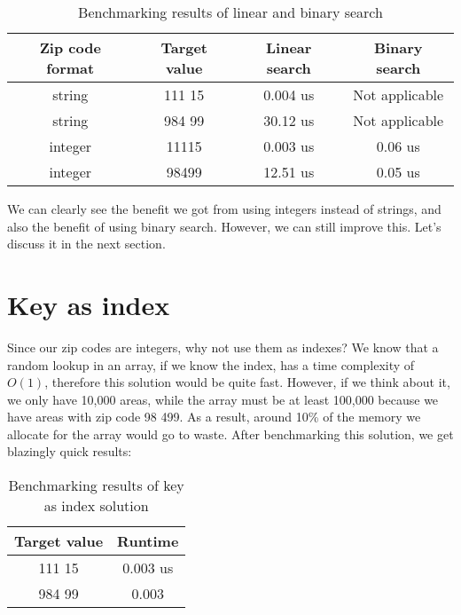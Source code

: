 \documentclass[a4paper,11pt]{article}
\begin{document}
    \begin{table}[H]
    \begin{center}
    \begin{tabular}{c|c|c|c}
    \textbf{Zip code format} & \textbf{Target value} & \textbf{Linear search} & \textbf{Binary search}\\
    \hline
        string  &   111 15     &  0.004 us &     Not applicable\\
        string &    984 99    &  30.12 us &     Not applicable\\
        integer &    11115    &  0.003 us &     0.06 us\\
        integer &    98499    &  12.51 us &     0.05 us\\
    \end{tabular}
    \caption{Benchmarking results of linear and binary search}
    \label{tab:table1}
    \end{center}
    \end{table}

    We can clearly see the benefit we got from using integers instead of strings, and also the benefit of using binary search.
    However, we can still improve this.
    Let's discuss it in the next section.

    \section*{Key as index}

    Since our zip codes are integers, why not use them as indexes?
    We know that a random lookup in an array, if we know the index, has a time complexity of $O(1)$, therefore this solution would be quite fast.
    However, if we think about it, we only have 10,000 areas, while the array must be at least 100,000 because we have areas with zip code 98 499.
    As a result, around 10\% of the memory we allocate for the array would go to waste.
    After benchmarking this solution, we get blazingly quick results:

    \begin{table}[H]
        \begin{center}
        \begin{tabular}{c|c}
        \textbf{Target value} & \textbf{Runtime}\\
        \hline
            111 15     &  0.003 us\\
            984 99    &  0.003\\
        \end{tabular}
        \caption{Benchmarking results of key as index solution}
        \label{tab:table2}
        \end{center}
        \end{table}
    
\end{document}
